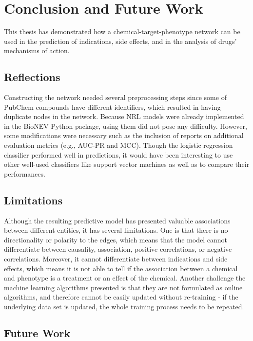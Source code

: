 \chapter{Conclusion and Future Work}
\label{conclusion}

This thesis has demonstrated how a chemical-target-phenotype network can be used in the prediction of indications, side effects, and in the analysis of drugs' mechanisms of action.

\section{Reflections}

Constructing the network needed several preprocessing steps since some of PubChem compounds have different identifiers, which resulted in having duplicate nodes in the network.
Because \ac{NRL} models were already implemented in the BioNEV Python package, using them did not pose any difficulty.
However, some modifications were necessary such as the inclusion of reports on additional evaluation metrics (e.g., AUC-PR and \ac{MCC}).
Though the logistic regression classifier performed well in predictions, it would have been interesting to use other well-used classifiers like support vector machines as well as to compare their performances.

\section{Limitations}

Although the resulting predictive model has presented valuable associations between different entities, it has several limitations.
One is that there is no directionality or polarity to the edges, which means that the model cannot differentiate between causality, association, positive correlations, or negative correlations.
Moreover, it cannot differentiate between indications and side effects, which means it is not able to tell if the association between a chemical and phenotype is a treatment or an effect of the chemical.
Another challenge the machine learning algorithms presented is that they are not formulated as online algorithms, and therefore cannot be easily updated without re-training - if the underlying data set is updated, the whole training process needs to be repeated.

\section{Future Work}

